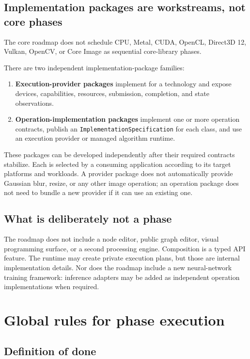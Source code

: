 \subsection{Implementation packages are workstreams, not core phases}

The core roadmap does not schedule CPU, Metal, CUDA, OpenCL, Direct3D 12, Vulkan, OpenCV, or Core Image as sequential core-library phases.

There are two independent implementation-package families:
\begin{enumerate}
  \item \textbf{Execution-provider packages} implement \GEP{} for a technology and expose devices, capabilities, resources, submission, completion, and state observations.
  \item \textbf{Operation-implementation packages} implement one or more \IPP{} operation contracts, publish an \texttt{ImplementationSpecification} for each class, and use an execution provider or managed algorithm runtime.
\end{enumerate}

These packages can be developed independently after their required contracts stabilize. Each is selected by a consuming application according to its target platforms and workloads. A provider package does not automatically provide Gaussian blur, resize, or any other image operation; an operation package does not need to bundle a new provider if it can use an existing one.

\subsection{What is deliberately not a phase}

The roadmap does not include a node editor, public graph editor, visual programming surface, or a second processing engine. Composition is a typed API feature. The runtime may create private execution plans, but those are internal implementation details. Nor does the roadmap include a new neural-network training framework: inference adapters may be added as independent operation implementations when required.

\section{Global rules for phase execution}

\subsection{Definition of done}

